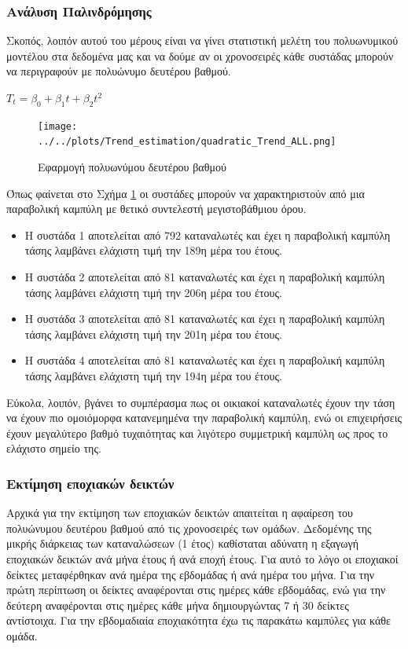 \subsubsection{Ανάλυση Παλινδρόμησης}
Σκοπός, λοιπόν αυτού του μέρους είναι να γίνει στατιστική μελέτη του πολυωνυμικού μοντέλου στα δεδομένα μας και να δούμε αν οι χρονοσειρές κάθε συστάδας μπορούν να περιγραφούν  με πολυώνυμο δευτέρου βαθμού. \cite{mathworkstrend}
\begin{center}
$T_t=\beta_0 + \beta_1t + \beta_2t^2$
\end{center}

\begin{figure}[ht!]
\centering
\texttt{[image: ../../plots/Trend\_estimation/quadratic\_Trend\_ALL.png]}
\caption{Εφαρμογή πολυωνύμου δευτέρου  βαθμού}
\label{fig:quadratic trend}
\end{figure}


Όπως φαίνεται στο Σχήμα \ref{fig:quadratic trend} οι συστάδες μπορούν να χαρακτηριστούν από μια παραβολική καμπύλη με θετικό συντελεστή μεγιστοβάθμιου όρου.
\begin{itemize}
\item Η συστάδα 1 αποτελείται από 792 καταναλωτές και έχει η παραβολική καμπύλη τάσης λαμβάνει ελάχιστη τιμή την 189η μέρα του έτους.
\item Η συστάδα 2 αποτελείται από 81 καταναλωτές και έχει η παραβολική καμπύλη τάσης λαμβάνει ελάχιστη τιμή την 206η μέρα του έτους. 
\item Η συστάδα 3 αποτελείται από 81 καταναλωτές και έχει η παραβολική καμπύλη τάσης λαμβάνει ελάχιστη τιμή την 201η μέρα του έτους.
\item Η συστάδα 4 αποτελείται από 81 καταναλωτές και έχει η παραβολική καμπύλη τάσης λαμβάνει ελάχιστη τιμή την 194η μέρα του έτους.
\end{itemize}

Εύκολα, λοιπόν, βγάνει το συμπέρασμα πως οι οικιακοί καταναλωτές έχουν την τάση να έχουν πιο ομοιόμορφα κατανεμημένα την παραβολική καμπύλη, ενώ οι επιχειρήσεις έχουν μεγαλύτερο βαθμό τυχαιότητας και λιγότερο συμμετρική καμπύλη ως προς το ελάχιστο σημείο της.
\subsubsection{Εκτίμηση εποχιακών δεικτών}
Αρχικά για την εκτίμηση των εποχιακών δεικτών απαιτείται η αφαίρεση του πολυώνυμου δευτέρου βαθμού από τις χρονοσειρές των ομάδων.\cite{timeseriesanalysis} Δεδομένης της μικρής διάρκειας των καταναλώσεων (1 έτος) καθίσταται αδύνατη η εξαγωγή εποχιακών δεικτών ανά μήνα έτους ή ανά εποχή έτους. Για αυτό το λόγο οι εποχιακοί δείκτες μεταφέρθηκαν ανά ημέρα της εβδομάδας ή ανά ημέρα του μήνα. Για την πρώτη περίπτωση οι δείκτες αναφέρονται στις ημέρες κάθε εβδομάδας, ενώ για την δεύτερη αναφέρονται στις ημέρες κάθε μήνα δημιουργώντας 7 ή 30 δείκτες αντίστοιχα. Για την εβδομαδιαία εποχιακότητα έχω τις παρακάτω καμπύλες για κάθε ομάδα.
